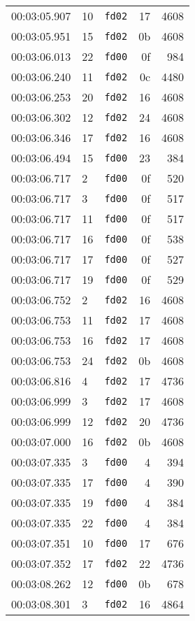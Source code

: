 \documentclass{article}
\begin{document}
\begin{longtable}{lllrr}
00:03:05.907 & 10 & \texttt{fd02} & 17 & 4608 \\
00:03:05.951 & 15 & \texttt{fd02} & 0b & 4608 \\
00:03:06.013 & 22 & \texttt{fd00} & 0f & 984 \\
00:03:06.240 & 11 & \texttt{fd02} & 0c & 4480 \\
00:03:06.253 & 20 & \texttt{fd02} & 16 & 4608 \\
00:03:06.302 & 12 & \texttt{fd02} & 24 & 4608 \\
00:03:06.346 & 17 & \texttt{fd02} & 16 & 4608 \\
00:03:06.494 & 15 & \texttt{fd00} & 23 & 384 \\
00:03:06.717 & 2 & \texttt{fd00} & 0f & 520 \\
00:03:06.717 & 3 & \texttt{fd00} & 0f & 517 \\
00:03:06.717 & 11 & \texttt{fd00} & 0f & 517 \\
00:03:06.717 & 16 & \texttt{fd00} & 0f & 538 \\
00:03:06.717 & 17 & \texttt{fd00} & 0f & 527 \\
00:03:06.717 & 19 & \texttt{fd00} & 0f & 529 \\
00:03:06.752 & 2 & \texttt{fd02} & 16 & 4608 \\
00:03:06.753 & 11 & \texttt{fd02} & 17 & 4608 \\
00:03:06.753 & 16 & \texttt{fd02} & 17 & 4608 \\
00:03:06.753 & 24 & \texttt{fd02} & 0b & 4608 \\
00:03:06.816 & 4 & \texttt{fd02} & 17 & 4736 \\
00:03:06.999 & 3 & \texttt{fd02} & 17 & 4608 \\
00:03:06.999 & 12 & \texttt{fd02} & 20 & 4736 \\
00:03:07.000 & 16 & \texttt{fd02} & 0b & 4608 \\
00:03:07.335 & 3 & \texttt{fd00} & 4 & 394 \\
00:03:07.335 & 17 & \texttt{fd00} & 4 & 390 \\
00:03:07.335 & 19 & \texttt{fd00} & 4 & 384 \\
00:03:07.335 & 22 & \texttt{fd00} & 4 & 384 \\
00:03:07.351 & 10 & \texttt{fd00} & 17 & 676 \\
00:03:07.352 & 17 & \texttt{fd02} & 22 & 4736 \\
00:03:08.262 & 12 & \texttt{fd00} & 0b & 678 \\
00:03:08.301 & 3 & \texttt{fd02} & 16 & 4864 \\

\end{longtable}
\end{document}

